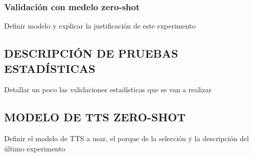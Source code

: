 \subsubsection{Validación con medelo zero-shot}
Definir modelo y explicar la justificación de este experimento

\subsection{DESCRIPCIÓN DE PRUEBAS ESTADÍSTICAS}
Detallar un poco las validaciones estadísticas que se van a realizar

\subsection{MODELO DE TTS ZERO-SHOT}
Definir el modelo de TTS a usar, el porque de la selección y la descripción del último experimento